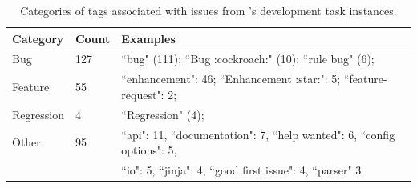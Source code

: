 \begin{table}[ht]
\centering
\begin{tabular}{l|ll}
\toprule
    Category & Count & Examples \\
\midrule
    Bug & 127 & ``bug" (111); ``Bug :cockroach:" (10); ``rule bug" (6); \\
    Feature & 55 & ``enhancement": 46; ``Enhancement :star:": 5; ``feature-request": 2; \\
    Regression & 4 & ``Regression" (4); \\
    Other & 95 & ``api": 11, ``documentation": 7, ``help wanted": 6, ``config options": 5, \\
          &    & ``io": 5, ``jinja": 4, ``good first issue": 4, ``parser" 3 \\
\bottomrule
\end{tabular}
\caption{Categories of tags associated with issues from \benchmark{}'s development task instances.}
\label{table:dev-issue-tags}
\end{table}